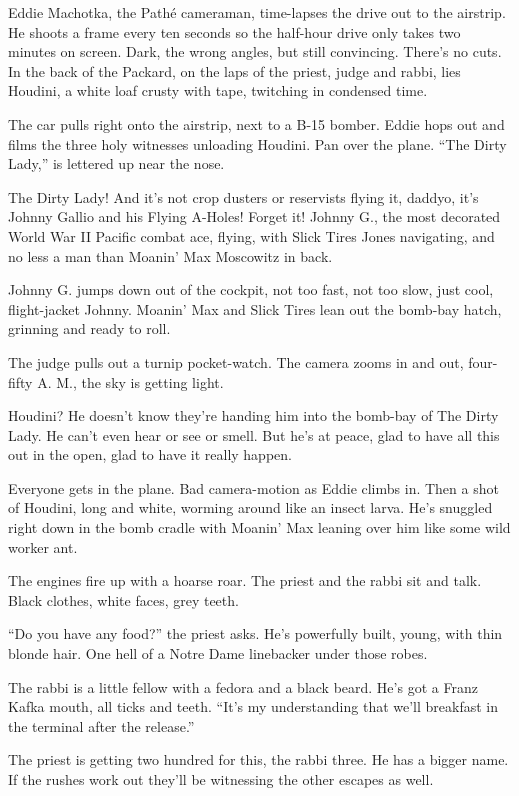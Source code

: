 Eddie Machotka, the Pathé cameraman, time-lapses the drive out to the airstrip. He shoots a frame every ten seconds so the half-hour drive only takes two minutes on screen. Dark, the wrong angles, but still convincing. There’s no cuts. In the back of the Packard, on the laps of the priest, judge and rabbi, lies Houdini, a white loaf crusty with tape, twitching in condensed time.

The car pulls right onto the airstrip, next to a B-15 bomber. Eddie hops out and films the three holy witnesses unloading Houdini. Pan over the plane. “The Dirty Lady,” is lettered up near the nose.

The Dirty Lady! And it’s not crop dusters or reservists flying it, daddyo, it’s Johnny Gallio and his Flying A-Holes! Forget it! Johnny G., the most decorated World War II Pacific combat ace, flying, with Slick Tires Jones navigating, and no less a man than Moanin’ Max Moscowitz in back.

Johnny G. jumps down out of the cockpit, not too fast, not too slow, just cool, flight-jacket Johnny. Moanin’ Max and Slick Tires lean out the bomb-bay hatch, grinning and ready to roll.

The judge pulls out a turnip pocket-watch. The camera zooms in and out, four-fifty A. M., the sky is getting light.

Houdini? He doesn’t know they’re handing him into the bomb-bay of The Dirty Lady. He can’t even hear or see or smell. But he’s at peace, glad to have all this out in the open, glad to have it really happen.

Everyone gets in the plane. Bad camera-motion as Eddie climbs in. Then a shot of Houdini, long and white, worming around like an insect larva. He’s snuggled right down in the bomb cradle with Moanin’ Max leaning over him like some wild worker ant.

The engines fire up with a hoarse roar. The priest and the rabbi sit and talk. Black clothes, white faces, grey teeth.

“Do you have any food?” the priest asks. He’s powerfully built, young, with thin blonde hair. One hell of a Notre Dame linebacker under those robes.

The rabbi is a little fellow with a fedora and a black beard. He’s got a Franz Kafka mouth, all ticks and teeth. “It’s my understanding that we’ll breakfast in the terminal after the release.”

The priest is getting two hundred for this, the rabbi three. He has a bigger name. If the rushes work out they’ll be witnessing the other escapes as well.

